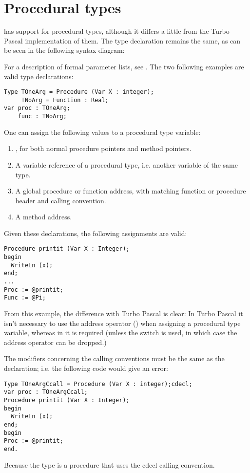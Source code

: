 \section{Procedural types}
\fpc has support for procedural types, although it differs a little from
the Turbo Pascal implementation of them. The type declaration remains the
same, as can be seen in the following syntax diagram:

For a description of formal parameter lists, see .
The two following examples are valid type declarations:
\begin{verbatim}
Type TOneArg = Procedure (Var X : integer);
     TNoArg = Function : Real;
var proc : TOneArg;
    func : TNoArg;
\end{verbatim}
One can assign the following values to a procedural type variable:
\begin{enumerate}
\item {}, for both normal procedure pointers and method pointers.
\item A variable reference of a procedural type, i.e. another variable of
the same type.
\item A global procedure or function address, with matching function or
procedure header and calling convention.
\item A method address.
\end{enumerate}
Given these declarations, the following assignments are valid:
\begin{verbatim}
Procedure printit (Var X : Integer);
begin
  WriteLn (x);
end;
...
Proc := @printit;
Func := @Pi;
\end{verbatim}
From this example, the difference with Turbo Pascal is clear: In Turbo
Pascal it isn't necessary to use the address operator ()
when assigning a procedural type variable, whereas in \fpc it is required
(unless the  switch is used, in which case the address
operator can be dropped.)
\begin{remark} The modifiers concerning the calling conventions
must be the same as the declaration;
i.e. the following code would give an error:
\begin{verbatim}
Type TOneArgCcall = Procedure (Var X : integer);cdecl;
var proc : TOneArgCcall;
Procedure printit (Var X : Integer);
begin
  WriteLn (x);
end;
begin
Proc := @printit;
end.
\end{verbatim}
Because the  type is a procedure that uses the cdecl
calling convention.
\end{remark}

